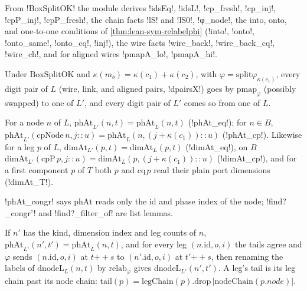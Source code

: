 From \lean!BoxSplitOK! the module derives \lean!idsEq!, \lean!idsL!, \lean!cp_fresh!, \lean!cp_inj!, \lean!cpP_inj!, \lean!cpP_fresh!, the chain facts \lean!lS! and \lean!lS0!, \lean!φ_node!, the into, onto, and one-to-one conditions of \cref{thm:lean-sym-relabelphi} (\lean!into!, \lean!onto!, \lean!onto_same!, \lean!onto_cq!, \lean!inj!), the wire facts \lean!wire_back!, \lean!wire_back_cq!, \lean!wire_ch!, and for aligned wires \lean!pmapA_lo!, \lean!pmapA_hi!.

\begin{theorem}
Under $\mathrm{BoxSplitOK}$ and $\kappa(m_b)=\kappa(c_1)+\kappa(c_2)$, with $\varphi=\mathrm{split}\varphi_{\kappa(c_1)}$, every digit pair of $L$ (wire, link, and aligned pairs, \lean!dpairsX!) goes by $\mathrm{pmap}_\varphi$ (possibly swapped) to one of $L'$, and every digit pair of $L'$ comes so from one of $L$.
\end{theorem}

\begin{proposition}
For a node $n$ of $L$, $\mathrm{phAt}_{L'}(n,t)=\mathrm{phAt}_L(n,t)$ (\lean!phAt_eq!); for $n\in B$, $\mathrm{phAt}_{L'}(\mathrm{cpNode}\,n,j\mathbin{::}u)=\mathrm{phAt}_L(n,(j+\kappa(c_1))\mathbin{::}u)$ (\lean!phAt_cp!). Likewise for a leg $p$ of $L$, $\mathrm{dimAt}_{L'}(p,t)=\mathrm{dimAt}_L(p,t)$ (\lean!dimAt_eq!), on $B$ $\mathrm{dimAt}_{L'}(\mathrm{cpP}\,p,j\mathbin{::}u)=\mathrm{dimAt}_L(p,(j+\kappa(c_1))\mathbin{::}u)$ (\lean!dimAt_cp!), and for a first component $p$ of $T$ both $p$ and $\mathrm{cq}\,p$ read their plain port dimensions (\lean!dimAt_T!).
\end{proposition}

\lean!phAt_congr! says $\mathrm{phAt}$ reads only the id and phase index of the node; \lean!find?_congr'! and \lean!find?_filter_of! are list lemmas.

\begin{proposition}
If $n'$ has the kind, dimension index and leg counts of $n$, $\mathrm{phAt}_{L'}(n',t')=\mathrm{phAt}_L(n,t)$, and for every leg $(n.\mathrm{id},o,i)$ the tails agree and $\varphi$ sends $(n.\mathrm{id},o,i)$ at $t\mathbin{+\!\!+}s$ to $(n'.\mathrm{id},o,i)$ at $t'\mathbin{+\!\!+}s$, then renaming the labels of $\mathrm{dnodeL}_L(n,t)$ by $\mathrm{relab}_\varphi$ gives $\mathrm{dnodeL}_{L'}(n',t')$. A leg's tail is its leg chain past its node chain: $\mathrm{tail}(p)=\mathrm{legChain}(p).\mathrm{drop}\,|\mathrm{nodeChain}(p.\mathit{node})|$.
\end{proposition}

